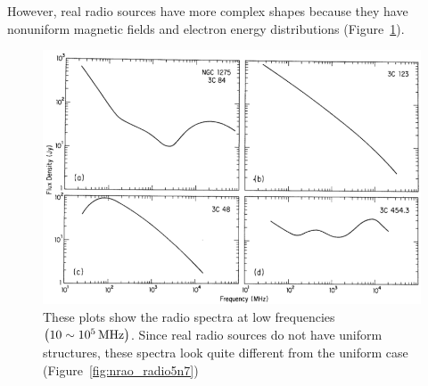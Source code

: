 However, real radio sources have more complex shapes because they have nonuniform magnetic fields and electron energy distributions (Figure~\ref{fig:nrao_radio5n8}).

\begin{figure}[htbp]
	\centering
	\includegraphics[width=.9\linewidth]{Chapter_2/Figures/NRAO_radio5n8.png}
    \caption[The spectrum of synchrotron radiation from real sources]{\label{fig:nrao_radio5n8}
        These plots show the radio spectra at low frequencies $\left(10 \sim 10^5\,\mathrm{MHz}\right)$.
        Since real radio sources do not have uniform structures, these spectra look quite different from the uniform case (Figure~\ref{fig:nrao_radio5n7})
    }
\end{figure}
